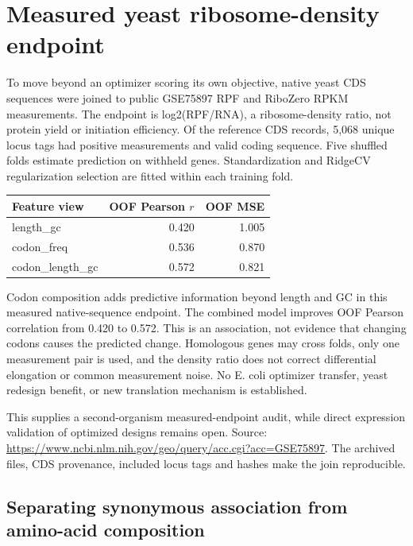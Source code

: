 \section{Measured yeast ribosome-density endpoint}

To move beyond an optimizer scoring its own objective, native yeast CDS sequences were joined to public GSE75897 RPF and RiboZero RPKM measurements. The endpoint is log2(RPF/RNA), a ribosome-density ratio, not protein yield or initiation efficiency. Of the reference CDS records, 5,068 unique locus tags had positive measurements and valid coding sequence. Five shuffled folds estimate prediction on withheld genes. Standardization and RidgeCV regularization selection are fitted within each training fold.

\begin{center}\begin{tabular}{lrr}\hline Feature view & OOF Pearson $r$ & OOF MSE\\\hline

length\_gc & 0.420 & 1.005 \\

codon\_freq & 0.536 & 0.870 \\

codon\_length\_gc & 0.572 & 0.821 \\

\hline\end{tabular}\end{center}

Codon composition adds predictive information beyond length and GC in this measured native-sequence endpoint. The combined model improves OOF Pearson correlation from 0.420 to 0.572. This is an association, not evidence that changing codons causes the predicted change. Homologous genes may cross folds, only one measurement pair is used, and the density ratio does not correct differential elongation or common measurement noise. No E. coli optimizer transfer, yeast redesign benefit, or new translation mechanism is established.

This supplies a second-organism measured-endpoint audit, while direct expression validation of optimized designs remains open. Source: \url{https://www.ncbi.nlm.nih.gov/geo/query/acc.cgi?acc=GSE75897}. The archived files, CDS provenance, included locus tags and hashes make the join reproducible.

\subsection{Separating synonymous association from amino-acid composition}

